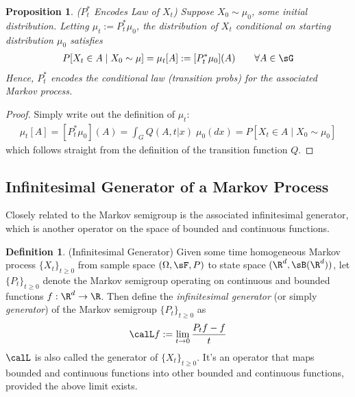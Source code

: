 \documentclass[12pt]{article}
\theoremstyle{plain}
\newtheorem{prop}[thm]{Proposition}
\theoremstyle{definition}
\newtheorem{defn}[thm]{Definition}
\theoremstyle{remark}
\newcommand{\ra}{\rightarrow}
\begin{document}
\begin{prop}\emph{($P_t^*$ Encodes Law of $X_t$)}
Suppose $X_0\sim \mu_0$, some initial distribution.
Letting $\mu_t:=P_t^*\mu_0$, the distribution of $X_t$ conditional on
starting distribution $\mu_0$ satisfies
\begin{align*}
  P[X_t\in A\;|\;X_0\sim \mu]
  =
  \mu_t[A]
  := [P_t^*\mu_0](A)
  \qquad
  \forall A\in \sG
\end{align*}
Hence, $P_t^*$ encodes the conditional law (transition probs) for the
associated Markov process.
\end{prop}
\begin{proof}
Simply write out the definition of $\mu_t$:
\begin{align*}
  \mu_t[A]
  =
  [P_t^*\mu_0](A)
  =
  \int_G Q(A,t|x)\;\mu_0(dx)
  =
  P[X_t\in A\;|\;X_0\sim\mu_0]
\end{align*}
which follows straight from the definition of the transition function
$Q$.
\end{proof}


\clearpage
\subsection{Infinitesimal Generator of a Markov Process}

Closely related to the Markov semigroup is the associated infinitesimal
generator, which is another operator on the space of bounded and
continuous functions.

\begin{defn}(Infinitesimal Generator)
Given some time homogeneous Markov process $\{X_t\}_{t\geq 0}$ from
sample space $(\Omega,\sF,P)$ to state space $(\R^d,\sB(\R^d))$, let
$\{P_t\}_{t\geq 0}$ denote the Markov semigroup operating on continuous
and bounded functions $f:\R^d\ra\R$.
Then define the \emph{infinitesimal generator} (or simply
\emph{generator}) of the Markov semigroup $\{P_t\}_{t\geq 0}$ as
\begin{align*}
  \calL f
  :=
  \lim_{t\ra 0}
  \frac{P_tf-f}{t}
\end{align*}
$\calL$ is also called the generator of $\{X_t\}_{t\geq 0}$.
It's an operator that
maps bounded and continuous functions into other bounded and
continuous functions, provided the above limit exists.
\end{defn}
\end{document}
